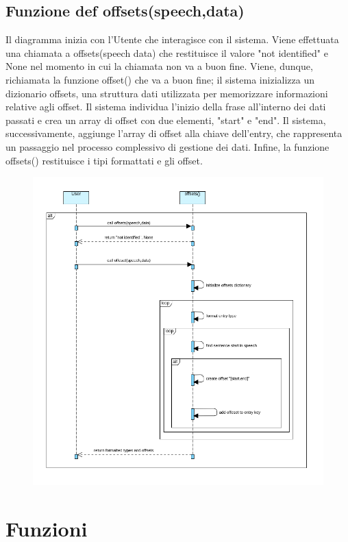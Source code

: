 \documentclass{article}
\begin{document}
	\subsection{Funzione def offsets(speech,data)}
Il diagramma inizia con l'Utente che interagisce con il sistema.
Viene effettuata una chiamata a offsets(speech data) che restituisce il valore "not identified" e None nel momento in cui la chiamata non va a buon fine.
Viene, dunque, richiamata la funzione offset() che va a buon fine; il sistema inizializza un dizionario offsets, una struttura dati utilizzata per memorizzare informazioni relative agli offset.
Il sistema individua l'inizio della frase all'interno dei dati passati e crea un array di offset con due elementi, "start" e "end".
Il sistema, successivamente, aggiunge l'array di offset alla chiave dell'entry, che rappresenta un passaggio nel processo complessivo di gestione dei dati.
Infine, la funzione offsets() restituisce i tipi formattati e gli offset.
		\begin{figure}[H]
		\centering
		\includegraphics[width=1.0\textwidth]{immagini/offset}
	\end{figure}
\newpage
	\section{Funzioni}
		
\end{document}
